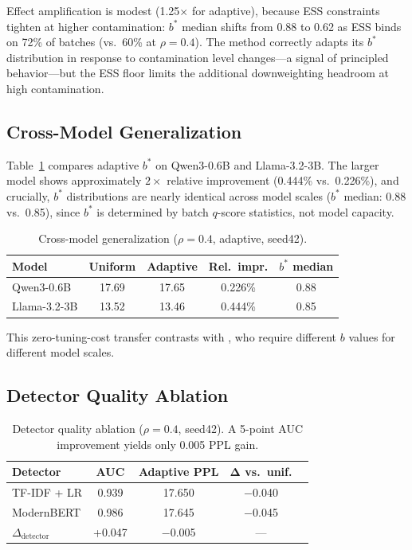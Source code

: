 \documentclass[11pt,a4paper]{article}
\newcommand{\bstar}{b^{*}}
\begin{document}
Effect amplification is modest (1.25$\times$ for adaptive), because ESS constraints tighten at higher contamination: $\bstar$ median shifts from 0.88 to 0.62 as ESS binds on 72\% of batches (vs.\ 60\% at $\rho=0.4$).
The method correctly adapts its $\bstar$ distribution in response to contamination level changes---a signal of principled behavior---but the ESS floor limits the additional downweighting headroom at high contamination.

\subsection{Cross-Model Generalization}
\label{sec:cross-model}

Table~\ref{tab:cross-model} compares adaptive $\bstar$ on Qwen3-0.6B and Llama-3.2-3B.
The larger model shows approximately $2\times$ relative improvement (0.444\% vs.\ 0.226\%), and crucially, $\bstar$ distributions are nearly identical across model scales ($\bstar$ median: 0.88 vs.\ 0.85), since $\bstar$ is determined by batch $q$-score statistics, not model capacity.

\begin{table}[t]
\centering
\small
\caption{Cross-model generalization ($\rho=0.4$, adaptive, seed42).}
\label{tab:cross-model}
\begin{tabular}{lcccc}
\toprule
\textbf{Model} & \textbf{Uniform} & \textbf{Adaptive} & \textbf{Rel.\ impr.} & $\bstar$ \textbf{median} \\
\midrule
Qwen3-0.6B & 17.69 & 17.65 & 0.226\% & 0.88 \\
Llama-3.2-3B & 13.52 & 13.46 & 0.444\% & 0.85 \\
\bottomrule
\end{tabular}
\end{table}

This zero-tuning-cost transfer contrasts with \citet{drayson-emnlp2025}, who require different $b$ values for different model scales.

\subsection{Detector Quality Ablation}
\label{sec:detector}

\begin{table}[t]
\centering
\small
\caption{Detector quality ablation ($\rho=0.4$, seed42). A 5-point AUC improvement yields only 0.005 PPL gain.}
\label{tab:detector}
\begin{tabular}{lcccc}
\toprule
\textbf{Detector} & \textbf{AUC} & \textbf{Adaptive PPL} & $\boldsymbol{\Delta}$ \textbf{vs.\ unif.} \\
\midrule
TF-IDF + LR & 0.939 & 17.650 & $-$0.040 \\
ModernBERT & 0.986 & 17.645 & $-$0.045 \\
\midrule
$\Delta_{\text{detector}}$ & +0.047 & $-$0.005 & --- \\
\bottomrule
\end{tabular}
\end{table}
\end{document}
